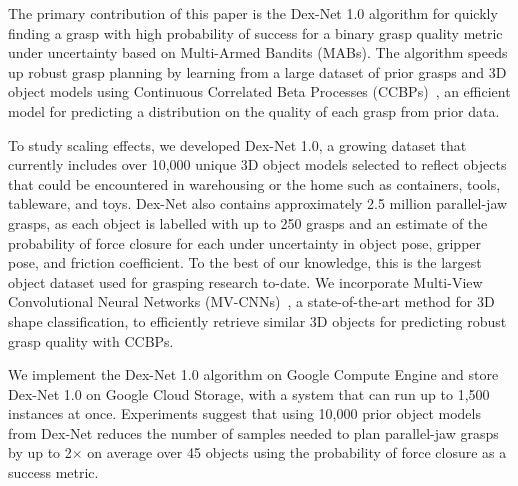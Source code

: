 The primary contribution of this paper is the Dex-Net 1.0 algorithm for quickly finding a grasp with high probability of success for a binary grasp quality metric under uncertainty based on Multi-Armed Bandits (MABs).
The algorithm speeds up robust grasp planning by learning from a large dataset of prior grasps and 3D object models using Continuous Correlated Beta Processes (CCBPs)~\cite{goetschalckx2011continuous, montesano2012active}, an efficient model for predicting a distribution on the quality of each grasp from prior data.

To study scaling effects, we developed Dex-Net 1.0, a growing dataset that currently includes over 10,000 unique 3D object models selected to reflect objects that could be encountered in warehousing or the home such as containers, tools, tableware, and toys.
Dex-Net also contains approximately 2.5 million parallel-jaw grasps, as each object is labelled with up to 250 grasps and an estimate of the probability of force closure for each under uncertainty in object pose, gripper pose, and friction coefficient.
To the best of our knowledge, this is the largest object dataset used for grasping research to-date.
We incorporate Multi-View Convolutional Neural Networks (MV-CNNs)~\cite{su2015multi}, a state-of-the-art method for 3D shape classification, to efficiently retrieve similar 3D objects for predicting robust grasp quality with CCBPs.

We implement the Dex-Net 1.0 algorithm on Google Compute Engine and store Dex-Net 1.0 on Google Cloud Storage, with a system that can run up to 1,500 instances at once.
Experiments suggest that using 10,000 prior object models from Dex-Net reduces the number of samples needed to plan parallel-jaw grasps by up to 2$\times$ on average over 45 objects using the probability of force closure as a success metric.

 






